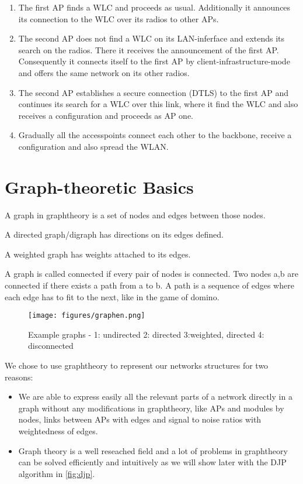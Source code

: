 	\begin{enumerate}
	  \item The first \ac{AP} finds a WLC and proceeds as usual. Additionally it announces its connection to the WLC over its radios to other APs.
	  
	  \item The second \ac{AP} does not find a \ac{WLC} on its LAN-inferface and extends its search on the radios. There it receives the announcement of the first \ac{AP}.
	    Consequently it connects itself to the first AP by client-infrastructure-mode and offers the same network on its other radios.
	    
	  \item The second \ac{AP} establishes a secure connection (\ac{DTLS}) to the first \ac{AP} and continues its search for a \ac{WLC} over this link, 
	    where it find the \ac{WLC} and also receives a configuration and proceeds as \ac{AP} one.
	    
	  \item Gradually all the accesspoints connect each other to the backbone, receive a configuration and also spread the WLAN.
	\end{enumerate}
	
\section{Graph-theoretic Basics}
  A graph in graphtheory is a set of nodes and edges between those nodes. 
  
  A directed graph/digraph has directions on its edges defined.
  
  A weighted graph has weights attached to its edges.
  
  A graph is called connected if every pair of nodes is connected. 
  Two nodes a,b are connected if there exists a path from a to b.
  A path is a sequence of edges where each edge has to fit to the next, like in the game of domino.
  
  \begin{figure}[th!]
    \centering
    \texttt{[image: figures/graphen.png]}
    \caption{Example graphs - 1: undirected 2: directed 3:weighted, directed 4: disconnected}
    \label{fig:graphen}
  \end{figure}

  We chose to use graphtheory to represent our networks structures for two reasons:
  \begin{itemize}
   \item We are able to express easily all the relevant parts of a network directly in a graph without any modifications in graphtheory,  
   like APs and modules by nodes, links between APs with edges and signal to noise ratios with weightedness of edges. 
    
   \item Graph theory is a well reseached field and a lot of problems in graphtheory can be solved efficiently and intuitively 
    as we will show later with the \ac{DJP} algorithm in \ref{fig:djp}.
  \end{itemize}
    
